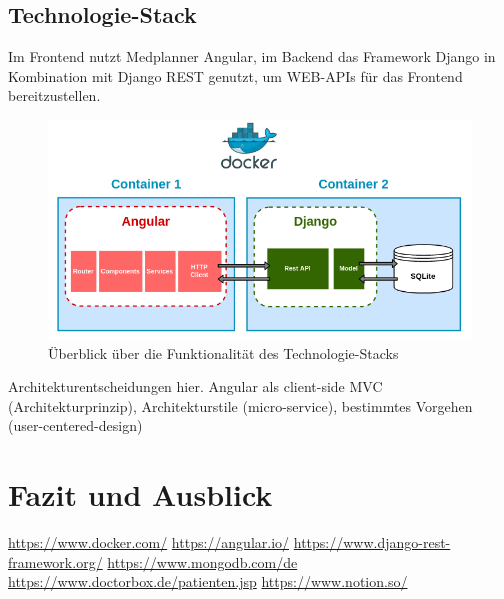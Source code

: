 \documentclass[conference]{IEEEtran}
\begin{document}
\subsection{Technologie-Stack}
Im Frontend nutzt Medplanner Angular, im Backend das Framework Django in Kombination mit Django REST genutzt, um WEB-APIs für das Frontend bereitzustellen.
\begin{figure}[!h]
	\centering
	\includegraphics[width=\columnwidth]{./figures/architecture_with_docker}
	\caption{Überblick über die Funktionalität des Technologie-Stacks}
\end{figure}

\newpage
Architekturentscheidungen hier.
Angular als client-side MVC (Architekturprinzip), Architekturstile (micro-service), bestimmtes Vorgehen (user-centered-design)

\section{Fazit und Ausblick}




\begin{thebibliography}{00}
 \url{https://www.docker.com/}
 \url{https://angular.io/}
 \url{https://www.django-rest-framework.org/}
 \url{https://www.mongodb.com/de}
 \url{https://www.doctorbox.de/patienten.jsp}
 \url{https://www.notion.so/}
\end{thebibliography}
\end{document}

